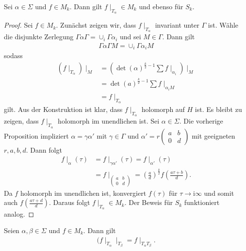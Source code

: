 \begin{prop}
Sei $\alpha \in \Sigma$ und $f \in M_k$.
Dann gilt $f\mid_{T_\alpha} \in M_k$ und ebenso für $S_k$.
\end{prop}
\begin{proof}
Sei $f \in M_k$.
Zunächst zeigen wir, dass $f \mid_{T_\alpha}$ invariant unter $\Gamma$ ist.
Wähle die disjunkte Zerlegung $\Gamma \alpha \Gamma=\cup_{i} \Gamma \alpha_i$ und sei $M \in \Gamma$.
Dann gilt
\begin{align*}
\Gamma \alpha \Gamma M=\cup_i \Gamma \alpha_i M
\end{align*}
sodass
\begin{align*}
(f \mid_{T_\alpha})\mid_M &=(\det(\alpha)^{\frac{k}{2}-1} \sum f\mid_{\alpha_i})\mid_M\\
&=\det(a)^{\frac{k}{2}-1} \sum f\mid_{\alpha_i M}\\
&=f \mid_{T_\alpha}
\end{align*}
gilt.
Aus der Konstruktion ist klar, dass $f\mid_{T_\alpha}$ holomorph auf $H$ ist.
Es bleibt zu zeigen, dass $f\mid_{T_\alpha}$ holomorph im unendlichen ist.
Sei $\alpha \in \Sigma$. Die vorherige Proposition impliziert $\alpha=\gamma \alpha'$
mit $\gamma \in \Gamma$ und $\alpha'=r \begin{pmatrix}
a&b\\
0&d
\end{pmatrix}$
mit geeigneten $r,a,b,d$.
Dann folgt
\begin{align*}
f\mid_{\alpha} (\tau)&=f\mid_{\gamma \alpha'}(\tau)=f\mid_{\alpha'}(\tau)\\
&=f\mid_{\begin{pmatrix}
a&b\\
0&d
\end{pmatrix}} =\left(\frac{a}{d}\right)^{\frac{k}{2}} f\left( \frac{a \tau+b}{d}\right).
\end{align*}
Da $f$ holomorph im unendlichen ist, konvergiert $f(\tau)$ für $\tau \to \mathrm{i}\infty$ und somit auch $f\left(\frac{a\tau+d}{d}\right)$.
Daraus folgt $f\mid_{T_\alpha} \in M_k$.
Der Beweis für $S_k$ funktioniert analog.
\end{proof}

\begin{prop}
Seien $\alpha,\beta \in \Sigma$ und $f \in M_k$.
Dann gilt
\begin{align*}
(f \mid_{T_\alpha}\mid_{T_\beta} =f\mid_{T_\alpha T_\beta}.
\end{align*}
\end{prop}


